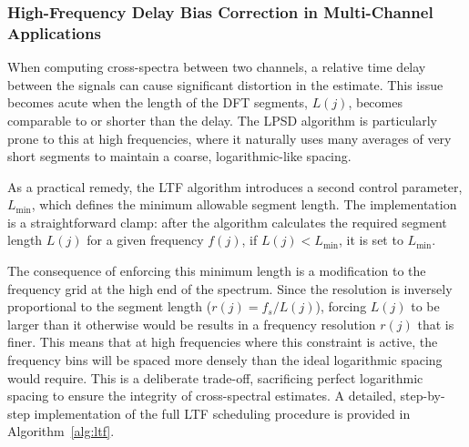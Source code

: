 \documentclass[final, 5p, times, twocolumn, number, sort&compress]{elsarticle}
\begin{document}
\subsubsection{High-Frequency Delay Bias Correction in Multi-Channel Applications}
When computing cross-spectra between two channels, a relative time delay between the signals can cause significant distortion in the estimate. This issue becomes acute when the length of the DFT segments, $L(j)$, becomes comparable to or shorter than the delay. The LPSD algorithm is particularly prone to this at high frequencies, where it naturally uses many averages of very short segments to maintain a coarse, logarithmic-like spacing.

As a practical remedy, the LTF algorithm introduces a second control parameter, $L_{\min}$, which defines the minimum allowable segment length. The implementation is a straightforward clamp: after the algorithm calculates the required segment length $L(j)$ for a given frequency $f(j)$, if $L(j) < L_{\min}$, it is set to $L_{\min}$.

The consequence of enforcing this minimum length is a modification to the frequency grid at the high end of the spectrum. Since the resolution is inversely proportional to the segment length ($r(j) = f_s/L(j)$), forcing $L(j)$ to be larger than it otherwise would be results in a frequency resolution $r(j)$ that is finer. This means that at high frequencies where this constraint is active, the frequency bins will be spaced more densely than the ideal logarithmic spacing would require. This is a deliberate trade-off, sacrificing perfect logarithmic spacing to ensure the integrity of cross-spectral estimates. A detailed, step-by-step implementation of the full LTF scheduling procedure is provided in Algorithm~\ref{alg:ltf}.
\end{document}
